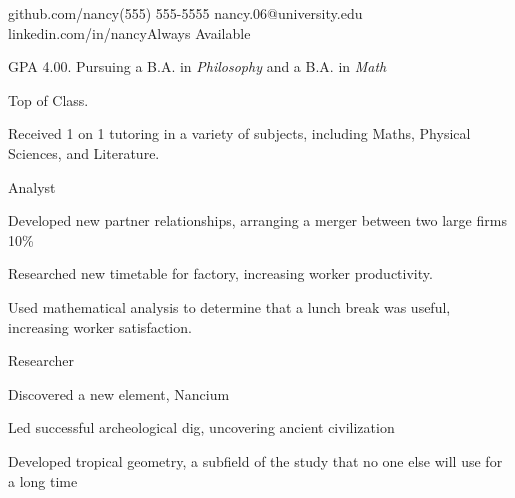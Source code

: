 \documentclass{practical-resume}
\begin{document}
\namehead

\address{nancy.com}{github.com/nancy}{(555) 555-5555}{ nancy.06@university.edu }{linkedin.com/in/nancy}{Always Available}


	\begin{position}{}{}
		\item GPA 4.00. Pursuing a B.A. in \textit{Philosophy} and a B.A. in \textit{Math}
		\item Top of Class.
	\end{position}

	\begin{position}{}{}
	\item Received 1 on 1 tutoring in a variety of subjects, including Maths, Physical Sciences, and Literature.
	\end{position}


	\begin{position}{Analyst}{}
		\item Developed new partner relationships, arranging a merger between two large firms 10\%
		\item Researched new timetable for factory, increasing worker productivity.
		\item Used mathematical analysis to determine that a lunch break was useful, increasing worker satisfaction.
		
	\end{position}

	\begin{position}{Researcher}{}
		\item Discovered a new element, Nancium
		\item Led successful archeological dig, uncovering ancient civilization
		\item Developed tropical geometry, a subfield of the study that no one else will use for a long time
		
	\end{position}
	
\end{document}
